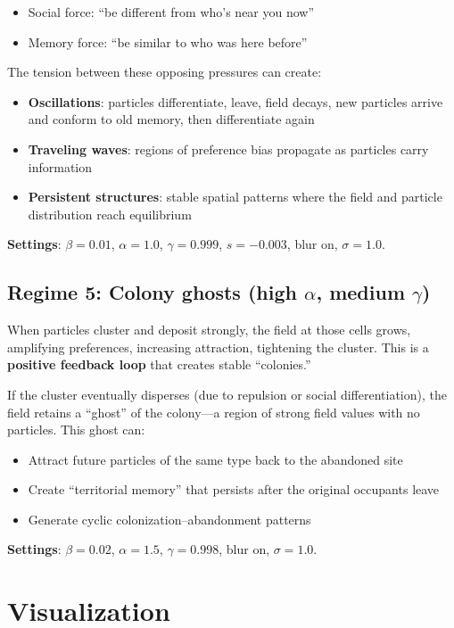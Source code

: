 \documentclass[11pt,a4paper]{article}
\begin{document}
\begin{itemize}[nosep]
\item Social force: ``be different from who's near you now''
\item Memory force: ``be similar to who was here before''
\end{itemize}

The tension between these opposing pressures can create:
\begin{itemize}[nosep]
\item \textbf{Oscillations}: particles differentiate, leave, field decays, new particles arrive and conform to old memory, then differentiate again
\item \textbf{Traveling waves}: regions of preference bias propagate as particles carry information
\item \textbf{Persistent structures}: stable spatial patterns where the field and particle distribution reach equilibrium
\end{itemize}

\textbf{Settings}: $\beta = 0.01$, $\alpha = 1.0$, $\gamma = 0.999$, $s = -0.003$, blur on, $\sigma = 1.0$.

\subsection{Regime 5: Colony ghosts (high $\alpha$, medium $\gamma$)}

When particles cluster and deposit strongly, the field at those cells grows, amplifying preferences, increasing attraction, tightening the cluster. This is a \textbf{positive feedback loop} that creates stable ``colonies.''

If the cluster eventually disperses (due to repulsion or social differentiation), the field retains a ``ghost'' of the colony---a region of strong field values with no particles. This ghost can:
\begin{itemize}[nosep]
\item Attract future particles of the same type back to the abandoned site
\item Create ``territorial memory'' that persists after the original occupants leave
\item Generate cyclic colonization--abandonment patterns
\end{itemize}

\textbf{Settings}: $\beta = 0.02$, $\alpha = 1.5$, $\gamma = 0.998$, blur on, $\sigma = 1.0$.

\section{Visualization}
\end{document}
